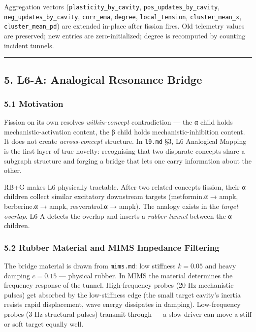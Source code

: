 \documentclass[
  11pt,
  a4paper,
]{article}
\begin{document}
Aggregation vectors (\texttt{plasticity\_by\_cavity},
\texttt{pos\_updates\_by\_cavity}, \texttt{neg\_updates\_by\_cavity},
\texttt{corr\_ema}, \texttt{degree}, \texttt{local\_tension},
\texttt{cluster\_mean\_x}, \texttt{cluster\_mean\_pd}) are extended
in-place after fission fires. Old telemetry values are preserved; new
entries are zero-initialized; degree is recomputed by counting incident
tunnels.

\begin{center}\rule{0.5\linewidth}{0.5pt}\end{center}

\subsection{5. L6-A: Analogical Resonance
Bridge}\label{l6-a-analogical-resonance-bridge}

\subsubsection{5.1 Motivation}\label{motivation}

Fission on its own resolves \emph{within-concept} contradiction --- the
α child holds mechanistic-activation content, the β child holds
mechanistic-inhibition content. It does not create \emph{across-concept}
structure. In \texttt{l9.md} §3, L6 Analogical Mapping is the first
layer of true novelty: recognising that two disparate concepts share a
subgraph structure and forging a bridge that lets one carry information
about the other.

RB+G makes L6 physically tractable. After two related concepts fission,
their α children collect similar excitatory downstream targets
(metformin.α → ampk, berberine.α → ampk, resveratrol.α → ampk). The
analogy exists in the \emph{target overlap}. L6-A detects the overlap
and inserts a \emph{rubber tunnel} between the α children.

\subsubsection{5.2 Rubber Material and MIMS Impedance
Filtering}\label{rubber-material-and-mims-impedance-filtering}

The bridge material is drawn from \texttt{mims.md}: low stiffness
\(k = 0.05\) and heavy damping \(c = 0.15\) --- physical rubber. In MIMS
the material determines the frequency response of the tunnel.
High-frequency probes (20 Hz mechanistic pulses) get absorbed by the
low-stiffness edge (the small target cavity's inertia resists rapid
displacement, wave energy dissipates in damping). Low-frequency probes
(3 Hz structural pulses) transmit through --- a slow driver can move a
stiff or soft target equally well.
\end{document}
